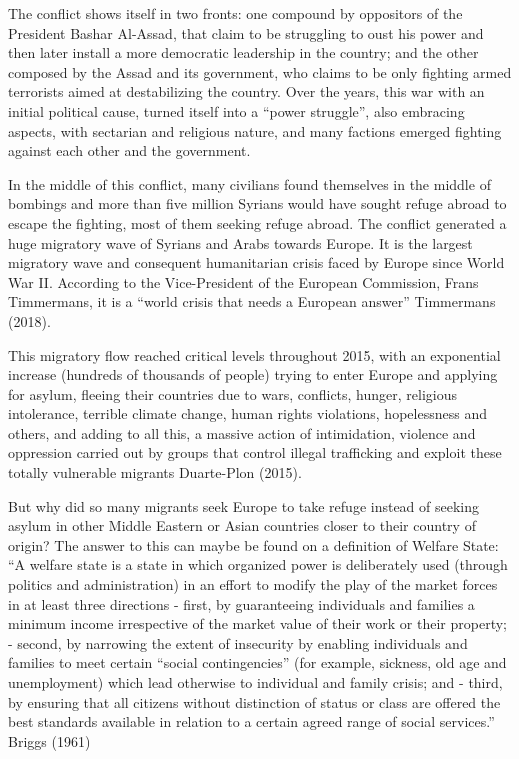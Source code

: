 \documentclass[]{elsarticle} %
\begin{document}
The conflict shows itself in two fronts: one compound by oppositors of
the President Bashar Al-Assad, that claim to be struggling to oust his
power and then later install a more democratic leadership in the
country; and the other composed by the Assad and its government, who
claims to be only fighting armed terrorists aimed at destabilizing the
country. Over the years, this war with an initial political cause,
turned itself into a ``power struggle'', also embracing aspects, with
sectarian and religious nature, and many factions emerged fighting
against each other and the government.

In the middle of this conflict, many civilians found themselves in the
middle of bombings and more than five million Syrians would have sought
refuge abroad to escape the fighting, most of them seeking refuge
abroad. The conflict generated a huge migratory wave of Syrians and
Arabs towards Europe. It is the largest migratory wave and consequent
humanitarian crisis faced by Europe since World War II. According to the
Vice-President of the European Commission, Frans Timmermans, it is a
``world crisis that needs a European answer'' Timmermans (2018).

This migratory flow reached critical levels throughout 2015, with an
exponential increase (hundreds of thousands of people) trying to enter
Europe and applying for asylum, fleeing their countries due to wars,
conflicts, hunger, religious intolerance, terrible climate change, human
rights violations, hopelessness and others, and adding to all this, a
massive action of intimidation, violence and oppression carried out by
groups that control illegal trafficking and exploit these totally
vulnerable migrants Duarte-Plon (2015).

But why did so many migrants seek Europe to take refuge instead of
seeking asylum in other Middle Eastern or Asian countries closer to
their country of origin? The answer to this can maybe be found on a
definition of Welfare State: ``A welfare state is a state in which
organized power is deliberately used (through politics and
administration) in an effort to modify the play of the market forces in
at least three directions - first, by guaranteeing individuals and
families a minimum income irrespective of the market value of their work
or their property; - second, by narrowing the extent of insecurity by
enabling individuals and families to meet certain ``social
contingencies'' (for example, sickness, old age and unemployment) which
lead otherwise to individual and family crisis; and - third, by ensuring
that all citizens without distinction of status or class are offered the
best standards available in relation to a certain agreed range of social
services.'' Briggs (1961)
\end{document}
